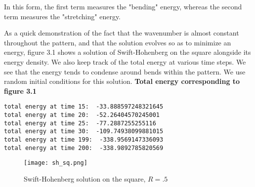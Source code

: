 \documentclass[12pt]{article}
\numberwithin{equation}{section}
\begin{document}
In this form, the first term measures the "bending" energy, whereas the second term measures the "stretching" energy.
\par As a quick demonstration of the fact that the wavenumber is almost constant throughout the pattern, and that the solution evolves so as to minimize an energy, figure 3.1 shows a solution of Swift-Hohenberg on the square alongside its energy density. We also keep track of the total energy at various time steps. We see that the energy tends to condense around bends within the pattern. We use random initial conditions for this solution.\newline
\textbf{Total energy corresponding to figure 3.1}
\begin{verbatim}
total energy at time 15:  -33.888597248321645
total energy at time 20:  -52.26404570245001
total energy at time 25:  -77.2887255255116
total energy at time 30:  -109.74938099881015
total energy at time 199:  -338.9569147336093
total energy at time 200:  -338.9892785820569
\end{verbatim}
\begin{figure}
\centering
\texttt{[image: sh\_sq.png]}
\caption{Swift-Hohenberg solution on the square, $R=.5$}
\end{figure}
\end{document}
